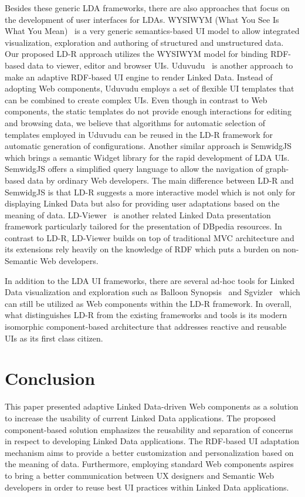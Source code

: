 \documentclass{acm_proc_article-sp}
\begin{document}
Besides these generic LDA frameworks, there are also approaches that focus on the development of user interfaces for LDAs.
WYSIWYM (What You See Is What You Mean)~\cite{WYSIWYM2014} is a very generic semantics-based UI model to allow integrated visualization, exploration and authoring of structured and unstructured data.
Our proposed LD-R approach utilizes the WYSIWYM model for binding RDF-based data to viewer, editor and browser UIs.
Uduvudu~\cite{Uduvudu2015} is another approach to make an adaptive RDF-based UI engine to render Linked Data.
Instead of adopting Web components, Uduvudu employs a set of flexible UI templates that can be combined to create complex UIs. 
Even though in contrast to Web components, the static templates do not provide enough interactions for editing and browsing data, we believe that algorithms for automatic selection of templates employed in Uduvudu can be reused in the LD-R framework for automatic generation of configurations.
Another similar approach is SemwidgJS~\cite{StegemannZ14} which brings a semantic Widget library for the rapid development of LDA UIs.
SemwidgJS offers a simplified query language to allow the navigation of graph-based data by ordinary Web developers.
The main difference between LD-R and SemwidgJS is that LD-R suggests a more interactive model which is not only for displaying Linked Data but also for providing user adaptations based on the meaning of data.
LD-Viewer~\cite{Lukovnikov2014} is another related Linked Data presentation framework particularly tailored for the presentation of DBpedia resources.
In contrast to LD-R, LD-Viewer  builds on top of traditional MVC architecture and its extensions rely heavily on the knowledge of RDF which puts a burden on non-Semantic Web developers.

In addition to the LDA UI frameworks, there are several ad-hoc tools for Linked Data visualization and exploration such as Balloon Synopsis~\cite{BalloonSchlegelWSGK14} and Sgvizler~\cite{Sgvizler} which can still be utilized as Web components within the LD-R framework. 
In overall, what distinguishes LD-R from the existing frameworks and tools is its modern isomorphic component-based architecture that addresses reactive and reusable UIs as its first class citizen.

\section{Conclusion}
This paper presented adaptive Linked Data-driven Web components as a solution to increase the usability of current Linked Data applications.
The proposed component-based solution emphasizes the reusability and separation of concerns in respect to developing Linked Data applications.
The RDF-based UI adaptation mechanism aims to provide a better customization and personalization based on the meaning of data.
Furthermore, employing standard Web components aspires to bring a better communication between UX designers and Semantic Web developers in order to reuse best UI practices within Linked Data applications.
\end{document}
